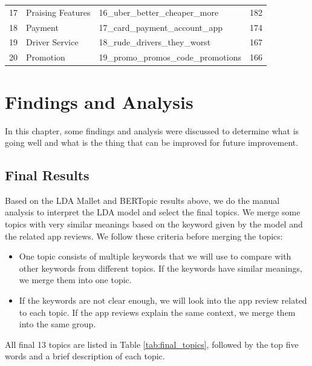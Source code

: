 \documentclass[12pt]{article}
\begin{document}
\begin{table}[!h]
\begin{tabular}{llll}
17          & Praising Features & 16\_uber\_better\_cheaper\_more            & 182             \\
18          & Payment           & 17\_card\_payment\_account\_app            & 174             \\
19          & Driver Service    & 18\_rude\_drivers\_they\_worst             & 167             \\
20          & Promotion         & 19\_promo\_promos\_code\_promotions        & 166   \\
\hline
\end{tabular}
\label{tab:bertopic_result}
\end{table}

\clearpage
\newpage
\section{Findings and Analysis}
In this chapter, some findings and analysis were discussed to determine what is going well and what is the thing that can be improved for future improvement.

\subsection{Final Results}
Based on the LDA Mallet and BERTopic results above, we do the manual analysis to interpret the LDA model and select the final topics. We merge some topics with very similar meanings based on the keyword given by the model and the related app reviews. We follow these criteria before merging the topics:

\begin{itemize}
\item One topic consists of multiple keywords that we will use to compare with other keywords from different topics. If the keywords have similar meanings, we merge them into one topic.
\item If the keywords are not clear enough, we will look into the app review related to each topic. If the app reviews explain the same context, we merge them into the same group.
\end{itemize}

All final 13 topics are listed in Table \ref{tab:final_topics}, followed by the top five words and a brief description of each topic.
\end{document}
